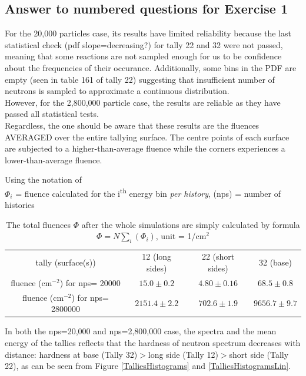 \documentclass[a4paper, 11pt]{article}
\begin{document}
\subsection{Answer to numbered questions for Exercise 1}\label{Ex1Ans}
\begin{compactenum}
	\item For the 20,000 particles case, its results have limited reliability because the last statistical check (pdf slope=decreasing?) for tally 22 and 32 were not passed, meaning that some reactions are not sampled enough for us to be confidence about the frequencies of their occurance. Additionally, some bins in the PDF are empty (seen in table 161 of tally 22) suggesting that insufficient number of neutrons is sampled to approximate a continuous distribution.
	\\However, for the 2,800,000 particle case, the results are reliable as they have passed all statistical tests.
	\\Regardless, the one should be aware that these results are the fluences AVERAGED over the entire tallying surface. The centre points of each surface are subjected to a higher-than-average fluence while the corners experiences a lower-than-average fluence.
	
	\item Using the notation of
	\\$\Phi_i$ = fluence calculated for the i\textsuperscript{th} energy bin \emph{per history}, (nps) = number of histories
	\begin{table}[H]
		\centering
		\begin{tabular}{cccc}
			tally (surface(s))            & 12 (long sides) & 22 (short sides) & 32 (base)\\
			fluence (cm$^{-2}$) for nps= 20000   & $15.0\pm 0.2$  & $4.80\pm 0.16$ & $68.5\pm 0.8$ \\
			fluence (cm$^{-2}$) for nps= 2800000 &$ 2151.4\pm2.2$ & $702.6\pm1.9$ & $9656.7 \pm9.7 $
		\end{tabular}
		\caption{ The total fluences $\Phi$ after the whole simulations are simply calculated by formula $\Phi= N \sum\limits_i (\Phi_i)$, unit = 1/cm${}^{2}$
		}\label{Ex1Fluences}
	\end{table}
	\item In both the nps=20,000 and nps=2,800,000 case, the spectra and the mean energy of the tallies reflects that the hardness of neutron spectrum decreases with distance: hardness at base (Tally 32)$>$long side (Tally 12)$>$short side (Tally 22), as can be seen from Figure \ref{TalliesHistograms} and \ref{TalliesHistogramsLin}.


\end{compactenum}
\end{document}

